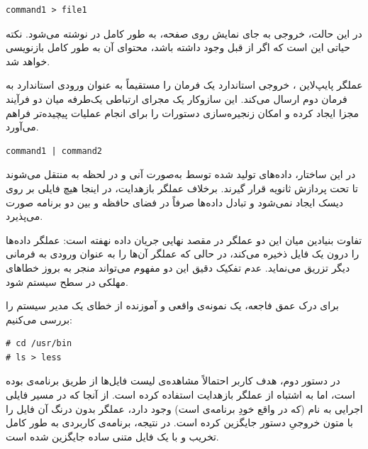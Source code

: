 \begin{latin}
\begin{lstlisting}
command1 > file1
\end{lstlisting}
\end{latin}

در این حالت، خروجی  به جای نمایش روی صفحه، به طور کامل در  نوشته می‌شود. نکته حیاتی این است که اگر  از قبل وجود داشته باشد، محتوای آن به طور کامل بازنویسی خواهد شد.

عملگر پایپ‌لاین \cmd{|}، خروجی استاندارد یک فرمان را مستقیماً به عنوان ورودی استاندارد به فرمان دوم ارسال می‌کند. این سازوکار یک مجرای ارتباطی یک‌طرفه میان دو فرآیند مجزا ایجاد کرده و امکان زنجیره‌سازی دستورات را برای انجام عملیات پیچیده‌تر فراهم می‌آورد.

\begin{latin}
\begin{lstlisting}
command1 | command2
\end{lstlisting}
\end{latin}

در این ساختار، داده‌های تولید شده توسط  به‌صورت آنی و در لحظه به  منتقل می‌شوند تا تحت پردازش ثانویه قرار گیرند. برخلاف عملگر بازهدایت، در اینجا هیچ فایلی بر روی دیسک ایجاد نمی‌شود و تبادل داده‌ها صرفاً در فضای حافظه و بین دو برنامه صورت می‌پذیرد.

تفاوت بنیادین میان این دو عملگر در مقصد نهایی جریان داده نهفته است: عملگر \cmd{>} داده‌ها را درون یک فایل ذخیره می‌کند، در حالی که عملگر \cmd{|} آن‌ها را به عنوان ورودی به فرمانی دیگر تزریق می‌نماید. عدم تفکیک دقیق این دو مفهوم می‌تواند منجر به بروز خطاهای مهلکی در سطح سیستم شود.

برای درک عمق فاجعه، یک نمونه‌ی واقعی و آموزنده از خطای یک مدیر سیستم را بررسی می‌کنیم:

\begin{latin}
\begin{lstlisting}
# cd /usr/bin
# ls > less
\end{lstlisting}
\end{latin}

در دستور دوم، هدف کاربر احتمالاً مشاهده‌ی لیست فایل‌ها از طریق برنامه‌ی  بوده است، اما به اشتباه از عملگر بازهدایت استفاده کرده است. از آنجا که در مسیر  فایلی اجرایی به نام  (که در واقع خودِ برنامه‌ی  است) وجود دارد، عملگر \cmd{>} بدون درنگ آن فایل را با متون خروجیِ دستور  جایگزین کرده است. در نتیجه، برنامه‌ی کاربردی  به طور کامل تخریب و با یک فایل متنی ساده جایگزین شده است.

